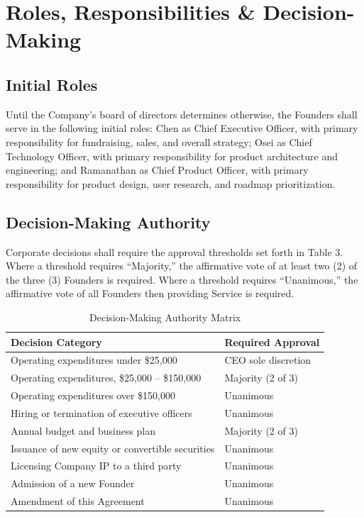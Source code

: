 \section{Roles, Responsibilities \& Decision-Making}

\subsection{Initial Roles} Until the Company's board of directors determines otherwise, the Founders shall serve in the following initial roles: Chen as Chief Executive Officer, with primary responsibility for fundraising, sales, and overall strategy; Osei as Chief Technology Officer, with primary responsibility for product architecture and engineering; and Ramanathan as Chief Product Officer, with primary responsibility for product design, user research, and roadmap prioritization.

\subsection{Decision-Making Authority} Corporate decisions shall require the approval thresholds set forth in Table 3. Where a threshold requires ``Majority,'' the affirmative vote of at least two (2) of the three (3) Founders is required. Where a threshold requires ``Unanimous,'' the affirmative vote of all Founders then providing Service is required.

\begin{table}[h]
  \centering
  \caption{Decision-Making Authority Matrix}
  \label{tab:decisions}
  \begin{tabularx}{\textwidth}{X l}
    \toprule
    \textbf{Decision Category} & \textbf{Required Approval} \\
    \midrule
    Operating expenditures under \$25,000 & CEO sole discretion \\
    Operating expenditures, \$25,000 -- \$150,000 & Majority (2 of 3) \\
    Operating expenditures over \$150,000 & Unanimous \\
    Hiring or termination of executive officers & Unanimous \\
    Annual budget and business plan & Majority (2 of 3) \\
    Issuance of new equity or convertible securities & Unanimous \\
    Licensing Company IP to a third party & Unanimous \\
    Admission of a new Founder & Unanimous \\
    Amendment of this Agreement & Unanimous \\
    \bottomrule
  \end{tabularx}
\end{table}


